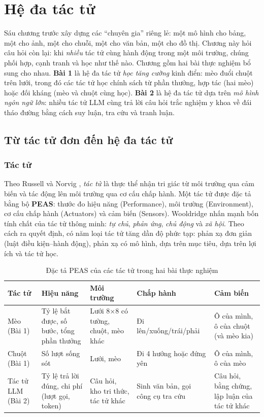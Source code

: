\chapter{Hệ đa tác tử}
\label{chap:mas}

Sáu chương trước xây dựng các ``chuyên gia'' riêng lẻ: một mô hình cho bảng, một cho ảnh, một cho chuỗi, một cho văn bản, một cho đồ thị. Chương này hỏi câu hỏi còn lại: khi \emph{nhiều} tác tử cùng hành động trong một môi trường, chúng phối hợp, cạnh tranh và học như thế nào. Chương gồm hai bài thực nghiệm bổ sung cho nhau. \textbf{Bài 1} là hệ đa tác tử \emph{học tăng cường} kinh điển: mèo đuổi chuột trên lưới, trong đó các tác tử học chính sách từ phần thưởng, hợp tác (hai mèo) hoặc đối kháng (mèo và chuột cùng học). \textbf{Bài 2} là hệ đa tác tử dựa trên \emph{mô hình ngôn ngữ lớn}: nhiều tác tử LLM cùng trả lời câu hỏi trắc nghiệm y khoa về đái tháo đường bằng cách suy luận, tra cứu và tranh luận.

\section{Từ tác tử đơn đến hệ đa tác tử}

\subsection{Tác tử}

Theo Russell và Norvig \cite{russell2021}, \emph{tác tử} là thực thể nhận tri giác từ môi trường qua cảm biến và tác động lên môi trường qua cơ cấu chấp hành. Một tác tử được đặc tả bằng bộ \textbf{PEAS}: thước đo hiệu năng (Performance), môi trường (Environment), cơ cấu chấp hành (Actuators) và cảm biến (Sensors). Wooldridge \cite{wooldridge2009} nhấn mạnh bốn tính chất của tác tử thông minh: \emph{tự chủ}, \emph{phản ứng}, \emph{chủ động} và \emph{xã hội}. Theo cách ra quyết định, có năm loại tác tử tăng dần độ phức tạp: phản xạ đơn giản (luật điều kiện–hành động), phản xạ có mô hình, dựa trên mục tiêu, dựa trên lợi ích và tác tử học.

\begin{table}[H]
\centering
\caption{Đặc tả PEAS của các tác tử trong hai bài thực nghiệm}
\label{tab:ch7-peas}
\small
\begin{tabularx}{\linewidth}{@{}L{2.4cm}YYYY@{}}
\toprule
\textbf{Tác tử} & \textbf{Hiệu năng} & \textbf{Môi trường} & \textbf{Chấp hành} & \textbf{Cảm biến} \\
\midrule
Mèo (Bài 1) & Tỷ lệ bắt được, số bước, tổng phần thưởng & Lưới 8×8 có tường, chuột, mèo khác & Đi lên/xuống/trái/phải & Ô của mình, ô của chuột (và mèo kia) \\
Chuột (Bài 1) & Số lượt sống sót & Lưới, mèo & Đi 4 hướng hoặc đứng yên & Ô của mình, ô của mèo \\
Tác tử LLM (Bài 2) & Tỷ lệ trả lời đúng, chi phí (lượt gọi, token) & Câu hỏi, kho tri thức, tác tử khác & Sinh văn bản, gọi công cụ tra cứu & Câu hỏi, bằng chứng, lập luận của tác tử khác \\
\bottomrule
\end{tabularx}
\end{table}

